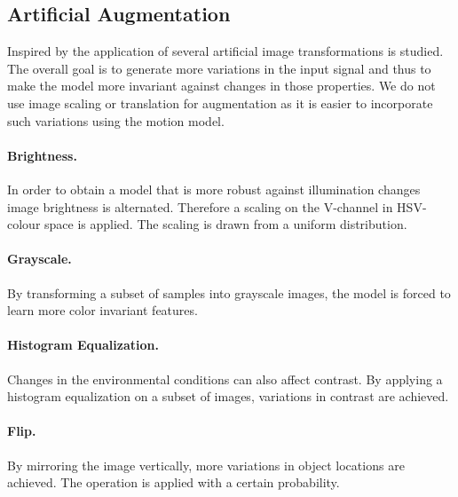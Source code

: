 \subsection{Artificial Augmentation}

Inspired by \cite{Howard2013, Redmon, Liu} the application of several artificial image transformations is studied. The overall goal is to generate more variations in the input signal and thus to make the model more invariant against changes in those properties. We do not use image scaling or translation for augmentation as it is easier to incorporate such variations using the motion model.

\paragraph{Brightness.} In order to obtain a model that is more robust against illumination changes image brightness is alternated. Therefore a scaling on the V-channel in HSV-colour space is applied. The scaling is drawn from a uniform distribution.
	
\paragraph{Grayscale.} By transforming a subset of samples into grayscale images, the model is forced to learn more color invariant features. 
	
\paragraph{Histogram Equalization.} Changes in the environmental conditions can also affect contrast. By applying a histogram equalization on a subset of images, variations in contrast are achieved. 
	
\paragraph{Flip.} By mirroring the image vertically, more variations in object locations are achieved. The operation is applied with a certain probability.


